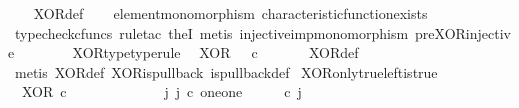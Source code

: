 \begin{isabellebody}
%
\isadelimproof
\ \ %
\endisadelimproof
%
\isatagproof
{}\isamarkupfalse%
\ XOR{\isacharunderscore}{\kern0pt}def\isanewline
\ \ \isamarkupfalse%
\ element{\isacharunderscore}{\kern0pt}monomorphism\ characteristic{\isacharunderscore}{\kern0pt}function{\isacharunderscore}{\kern0pt}exists\isanewline
\ \ \isamarkupfalse%
\ {\isacharparenleft}{\kern0pt}typecheck{\isacharunderscore}{\kern0pt}cfuncs{\isacharcomma}{\kern0pt}\ rule{\isacharunderscore}{\kern0pt}tac\ the{}I{}{\isacharcomma}{\kern0pt}\ metis\ injective{\isacharunderscore}{\kern0pt}imp{\isacharunderscore}{\kern0pt}monomorphism\ pre{\isacharunderscore}{\kern0pt}XOR{\isacharunderscore}{\kern0pt}injective{\isacharparenright}{\kern0pt}%
\endisatagproof
{\isafoldproof}%
%
\isadelimproof
\isanewline
%
\endisadelimproof
\ \ \ \ \ \ \isanewline
{}\isamarkupfalse%
\ XOR{\isacharunderscore}{\kern0pt}type{\isacharbrackleft}{\kern0pt}type{\isacharunderscore}{\kern0pt}rule{\isacharbrackright}{\kern0pt}{\isacharcolon}{\kern0pt}\isanewline
\ \ {\isachardoublequoteopen}XOR\ {\isacharcolon}{\kern0pt}\ {\isasymOmega}\ {\isasymtimes}\isactrlsub c\ {\isasymOmega}\ {\isasymrightarrow}\ {\isasymOmega}{\isachardoublequoteclose}\isanewline
%
\isadelimproof
\ \ %
\endisadelimproof
%
\isatagproof
{}\isamarkupfalse%
\ XOR{\isacharunderscore}{\kern0pt}def\isanewline
\ \ \isamarkupfalse%
\ {\isacharparenleft}{\kern0pt}metis\ XOR{\isacharunderscore}{\kern0pt}def\ XOR{\isacharunderscore}{\kern0pt}is{\isacharunderscore}{\kern0pt}pullback\ is{\isacharunderscore}{\kern0pt}pullback{\isacharunderscore}{\kern0pt}def{\isacharparenright}{\kern0pt}%
\endisatagproof
{\isafoldproof}%
%
\isadelimproof
\isanewline
%
\endisadelimproof
\isanewline
{}\isamarkupfalse%
\ XOR{\isacharunderscore}{\kern0pt}only{\isacharunderscore}{\kern0pt}true{\isacharunderscore}{\kern0pt}left{\isacharunderscore}{\kern0pt}is{\isacharunderscore}{\kern0pt}true{\isacharcolon}{\kern0pt}\isanewline
\ \ {\isachardoublequoteopen}XOR\ {\isasymcirc}\isactrlsub c\ \ {\isasymlangle}{\isasymt}{\isacharcomma}{\kern0pt}{\isasymf}{\isasymrangle}\ {\isacharequal}{\kern0pt}\ {\isasymt}{\isachardoublequoteclose}\isanewline
%
\isadelimproof
%
\endisadelimproof
%
\isatagproof
{}\isamarkupfalse%
\ {\isacharminus}{\kern0pt}\ \ \ \isanewline
\ \ \isamarkupfalse%
\ {\isachardoublequoteopen}{\isasymexists}\ j{\isachardot}{\kern0pt}\ j\ {\isasymin}\isactrlsub c\ one{\isasymCoprod}one\ {\isasymand}\ {\isacharparenleft}{\kern0pt}{\isasymlangle}{\isasymt}{\isacharcomma}{\kern0pt}\ {\isasymf}{\isasymrangle}\ {\isasymamalg}{\isasymlangle}{\isasymf}{\isacharcomma}{\kern0pt}\ {\isasymt}{\isasymrangle}{\isacharparenright}{\kern0pt}\ {\isasymcirc}\isactrlsub c\ j\ \ {\isacharequal}{\kern0pt}\ {\isasymlangle}{\isasymt}{\isacharcomma}{\kern0pt}{\isasymf}{\isasymrangle}{\isachardoublequoteclose}\isanewline

\end{isabellebody}
